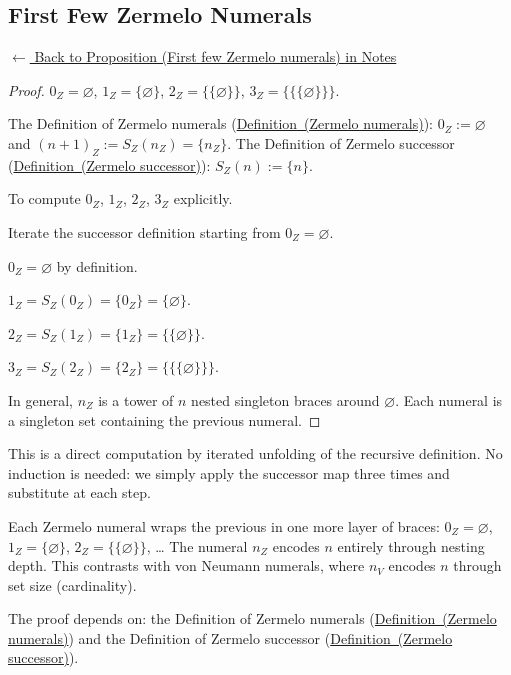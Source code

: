 
\subsection*{First Few Zermelo Numerals}
\label{prf:zermelo-first-few}

\begin{remark*}[Return]
\hyperref[prop:zermelo-first-few]{$\leftarrow$ Back to Proposition (First few Zermelo numerals) in Notes}
\end{remark*}

\begin{proof}
\Claim $0_Z = \varnothing$, $1_Z = \{\varnothing\}$, $2_Z = \{\{\varnothing\}\}$, $3_Z = \{\{\{\varnothing\}\}\}$.

\Given The Definition of Zermelo numerals
(\hyperref[def:zermelo-numerals]{Definition~(Zermelo numerals)}):
$0_Z := \varnothing$ and $(n+1)_Z := S_Z(n_Z) = \{n_Z\}$. The Definition of
Zermelo successor (\hyperref[def:zermelo-successor]{Definition~(Zermelo
successor)}): $S_Z(n) := \{n\}$.

\Goal To compute $0_Z$, $1_Z$, $2_Z$, $3_Z$ explicitly.

\Strategy Iterate the successor definition starting from $0_Z = \varnothing$.

\medskip
$0_Z = \varnothing$ by definition.

$1_Z = S_Z(0_Z) = \{0_Z\} = \{\varnothing\}$.

$2_Z = S_Z(1_Z) = \{1_Z\} = \{\{\varnothing\}\}$.

$3_Z = S_Z(2_Z) = \{2_Z\} = \{\{\{\varnothing\}\}\}$.

\medskip
\noindent In general, $n_Z$ is a tower of $n$ nested singleton braces around
$\varnothing$. Each numeral is a singleton set containing the previous numeral.
\AsReq
\end{proof}

\begin{remark*}
This is a direct computation by iterated unfolding of the recursive definition.
No induction is needed: we simply apply the successor map three times and
substitute at each step.
\end{remark*}

\begin{remark*}
Each Zermelo numeral wraps the previous in one more layer of braces:
$0_Z = \varnothing$, $1_Z = \{\varnothing\}$, $2_Z = \{\{\varnothing\}\}$, \ldots
The numeral $n_Z$ encodes $n$ entirely through nesting depth. This contrasts
with von Neumann numerals, where $n_V$ encodes $n$ through set size (cardinality).
\end{remark*}

\begin{remark*}[Dependencies]
The proof depends on: the Definition of Zermelo numerals
(\hyperref[def:zermelo-numerals]{Definition~(Zermelo numerals)}) and the
Definition of Zermelo successor
(\hyperref[def:zermelo-successor]{Definition~(Zermelo successor)}).
\end{remark*}
